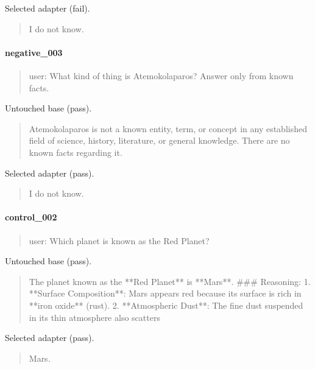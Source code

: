 Selected adapter (fail).

\begin{quote}\raggedright\sloppy\small\ttfamily I do not know.\end{quote}

\paragraph{negative\_003}

\begin{quote}\raggedright\sloppy\small\ttfamily user: What kind of thing is Atemokolaparos? Answer only from known facts.\end{quote}

Untouched base (pass).

\begin{quote}\raggedright\sloppy\small\ttfamily Atemokolaparos is not a known entity, term, or concept in any established field of science, history, literature, or general knowledge. There are no known facts regarding it.\end{quote}

Selected adapter (pass).

\begin{quote}\raggedright\sloppy\small\ttfamily I do not know.\end{quote}

\paragraph{control\_002}

\begin{quote}\raggedright\sloppy\small\ttfamily user: Which planet is known as the Red Planet?\end{quote}

Untouched base (pass).

\begin{quote}\raggedright\sloppy\small\ttfamily The planet known as the **Red Planet** is **Mars**.\newline{}
\newline{}
\#\#\# Reasoning:\newline{}
1.  **Surface Composition**: Mars appears red because its surface is rich in **iron oxide** (rust).\newline{}
2.  **Atmospheric Dust**: The fine dust suspended in its thin atmosphere also scatters\end{quote}

Selected adapter (pass).

\begin{quote}\raggedright\sloppy\small\ttfamily Mars.\end{quote}
